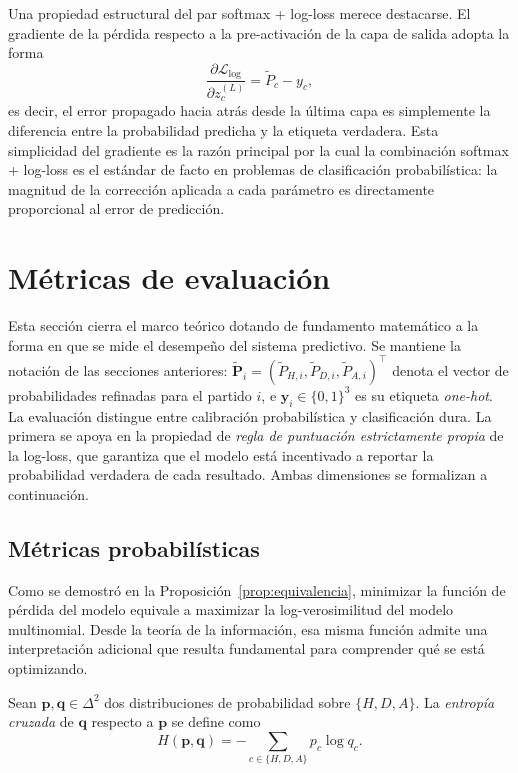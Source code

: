 Una propiedad estructural del par softmax + log-loss merece destacarse. El gradiente de la p\'erdida respecto a la pre-activaci\'on de la capa de salida adopta la forma
\begin{equation}\label{eq:gradiente_salida}
	\frac{\partial \mathcal{L}_{\mathrm{log}}}{\partial z_c^{(L)}} = \tilde{P}_c - y_c,
\end{equation}
es decir, el error propagado hacia atr\'as desde la \'ultima capa es simplemente la diferencia entre la probabilidad predicha y la etiqueta verdadera. Esta simplicidad del gradiente es la raz\'on principal por la cual la combinaci\'on softmax + log-loss es el est\'andar de facto en problemas de clasificaci\'on probabil\'istica: la magnitud de la correcci\'on aplicada a cada par\'ametro es directamente proporcional al error de predicci\'on.

\section{M\'etricas de evaluaci\'on}
\label{sec:metricas}

Esta secci\'on cierra el marco te\'orico dotando de fundamento matem\'atico a la forma en que se mide el desempe\~no del sistema predictivo. Se mantiene la notaci\'on de las secciones anteriores: $\tilde{\mathbf{P}}_i = (\tilde{P}_{H,i}, \tilde{P}_{D,i}, \tilde{P}_{A,i})^\top$ denota el vector de probabilidades refinadas para el partido $i$, e $\mathbf{y}_i \in \{0,1\}^3$ es su etiqueta \emph{one-hot}. La evaluaci\'on distingue entre calibraci\'on probabil\'istica y clasificaci\'on dura. La primera se apoya en la propiedad de \emph{regla de puntuaci\'on estrictamente propia} de la log-loss, que garantiza que el modelo est\'a incentivado a reportar la probabilidad verdadera de cada resultado. Ambas dimensiones se formalizan a continuaci\'on.

\subsection{M\'etricas probabil\'isticas}
\label{subsec:logloss_metricas}

Como se demostr\'o en la Proposici\'on~\ref{prop:equivalencia}, minimizar la funci\'on de p\'erdida del modelo equivale a maximizar la log-verosimilitud del modelo multinomial. Desde la teor\'ia de la informaci\'on, esa misma funci\'on admite una interpretaci\'on adicional que resulta fundamental para comprender qu\'e se est\'a optimizando.

\begin{definition}
	Sean $\mathbf{p}, \mathbf{q} \in \Delta^2$ dos distribuciones de probabilidad sobre $\{H,D,A\}$. La \emph{entrop\'ia cruzada} de $\mathbf{q}$ respecto a $\mathbf{p}$ se define como
	\begin{equation}\label{eq:entropia_cruzada}
		H(\mathbf{p}, \mathbf{q}) = -\sum_{c\in\{H,D,A\}} p_c \log q_c.
	\end{equation}
\end{definition}

